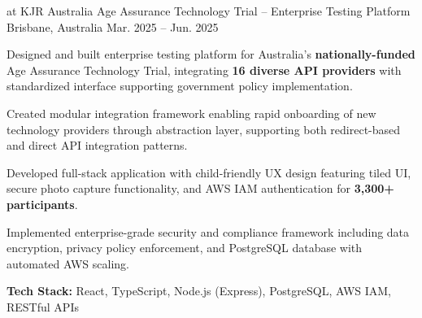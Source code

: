 
\begin{cventries}


  \cventry
    {at KJR} %
    {Australia Age Assurance Technology Trial – Enterprise Testing Platform} %
    {Brisbane, Australia} %
    {Mar. 2025 – Jun. 2025} %
    {
      \begin{cvitems}
        \item {Designed and built enterprise testing platform for Australia's \textbf{nationally-funded} Age Assurance Technology Trial, integrating \textbf{16 diverse API providers} with standardized interface supporting government policy implementation.}
        \item {Created modular integration framework enabling rapid onboarding of new technology providers through abstraction layer, supporting both redirect-based and direct API integration patterns.}
        \item {Developed full-stack application with child-friendly UX design featuring tiled UI, secure photo capture functionality, and AWS IAM authentication for \textbf{3,300+ participants}.}
        \item {Implemented enterprise-grade security and compliance framework including data encryption, privacy policy enforcement, and PostgreSQL database with automated AWS scaling.}
        \item {\textbf{Tech Stack:} React, TypeScript, Node.js (Express), PostgreSQL, AWS IAM, RESTful APIs}
      \end{cvitems}
    }


\end{cventries}
